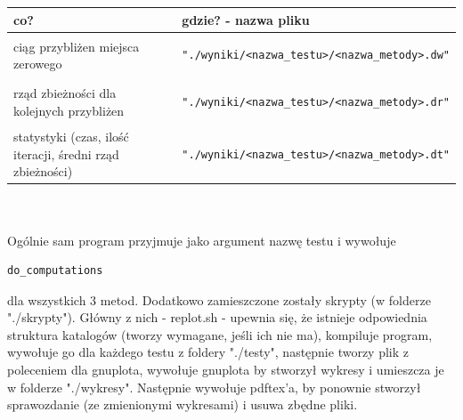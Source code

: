 \documentclass[11pt,wide]{mwart}
\begin{document}
\begin{tabular}{l l}
   \hline
  co?                                                       & gdzie? - nazwa pliku\\
  \hline
  ciąg przybliżen miejsca zerowego                          & 
    \begin{minipage}{3in} \begin{verbatim}"./wyniki/<nazwa_testu>/<nazwa_metody>.dw"\end{verbatim} 
      \end{minipage}\\
  rząd zbieżności dla kolejnych przybliżen                  & 
     \begin{minipage}{3in} \begin{verbatim}"./wyniki/<nazwa_testu>/<nazwa_metody>.dr"\end{verbatim} 
      \end{minipage}\\
  statystyki (czas, ilość iteracji, średni rząd zbieżności) & 
    \begin{minipage}{3in} \begin{verbatim}"./wyniki/<nazwa_testu>/<nazwa_metody>.dt"\end{verbatim} 
      \end{minipage}\\
\end{tabular}
\\ \\ \indent Ogólnie sam program przyjmuje jako argument nazwę testu i wywołuje 
\begin{verbatim}do_computations\end{verbatim} dla wszystkich 3 metod.
Dodatkowo zamieszczone zostały skrypty (w folderze "./skrypty"). Główny z nich - replot.sh - upewnia się, że istnieje odpowiednia struktura katalogów (tworzy wymagane, jeśli ich nie ma), kompiluje program, wywołuje go dla każdego testu z foldery "./testy", następnie tworzy plik z poleceniem dla gnuplota, wywołuje gnuplota by stworzył wykresy i umieszcza je w folderze "./wykresy". Następnie wywołuje pdftex'a, by ponownie stworzył sprawozdanie (ze zmienionymi wykresami) i usuwa zbędne pliki.
\end{document}
